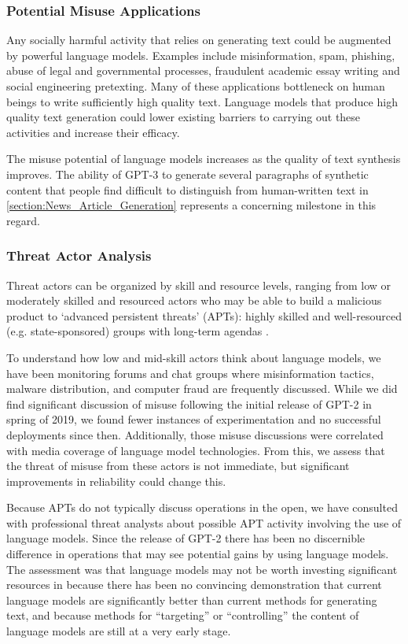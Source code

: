 \documentclass{article}
\begin{document}
        \subsubsection{Potential Misuse Applications}
        \label{section:Potential_Misuse_Applications}
        Any socially harmful activity that relies on generating text could be augmented by powerful language models. Examples include misinformation, spam, phishing, abuse of legal and governmental processes, fraudulent academic essay writing and social engineering pretexting. Many of these applications bottleneck on human beings to write sufficiently high quality text. Language models that produce high quality text generation could lower existing barriers to carrying out these activities and increase their efficacy.

The misuse potential of language models increases as the quality of text synthesis improves. The ability of GPT-3 to generate several paragraphs of synthetic content that people find difficult to distinguish from human-written text in \ref{section:News_Article_Generation} represents a concerning milestone in this regard.     
        \subsubsection{Threat Actor Analysis}
        \label{section:Threat_Actor_Analysis}
        Threat actors can be organized by skill and resource levels, ranging from low or moderately skilled and resourced actors who may be able to build a malicious product to `advanced persistent threats' (APTs): highly skilled and well-resourced (e.g. state-sponsored) groups with long-term agendas \cite{solaiman2019release}.

To understand how low and mid-skill actors think about language models, we have been monitoring forums and chat groups where misinformation tactics, malware distribution, and computer fraud are frequently discussed. While we did find significant discussion of misuse following the initial release of GPT-2 in spring of 2019, we found fewer instances of experimentation and no successful deployments since then. Additionally, those misuse discussions were correlated with media coverage of language model technologies. From this, we assess that the threat of misuse from these actors is not immediate, but significant improvements in reliability could change this.

Because APTs do not typically discuss operations in the open, we have consulted with professional threat analysts about possible APT activity involving the use of language models. Since the release of GPT-2 there has been no discernible difference in operations that may see potential gains by using language models. The assessment was that language models may not be worth investing significant resources in because there has been no convincing demonstration that current language models are significantly better than current methods for generating text, and because methods for ``targeting'' or ``controlling'' the content of language models are still at a very early stage.
\end{document}

